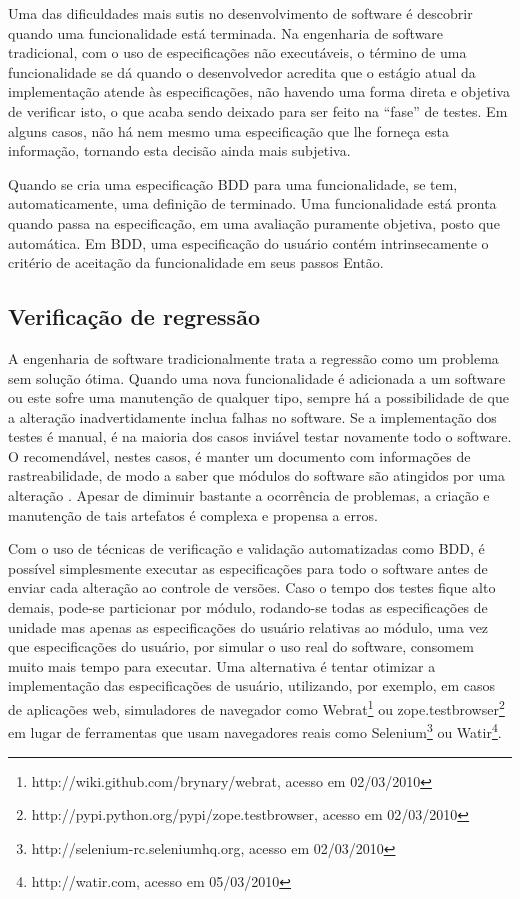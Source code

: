 \documentclass[a4paper,abntfigtabnum,noindentfirst]{abnt}
\begin{document}
Uma das dificuldades mais sutis no desenvolvimento de software é descobrir quando uma funcionalidade está terminada. Na engenharia de software tradicional, com o uso de especificações não executáveis, o término de uma funcionalidade se dá quando o desenvolvedor acredita que o estágio atual da implementação atende às especificações, não havendo uma forma direta e objetiva de verificar isto, o que acaba sendo deixado para ser feito na ``fase'' de testes. Em alguns casos, não há nem mesmo uma especificação que lhe forneça esta informação, tornando esta decisão ainda mais subjetiva.

Quando se cria uma especificação BDD para uma funcionalidade, se tem, automaticamente, uma definição de terminado. Uma funcionalidade está pronta quando passa na especificação, em uma avaliação puramente objetiva, posto que automática. Em BDD, uma especificação do usuário contém intrinsecamente o critério de aceitação da funcionalidade em seus passos Então.


\subsection*{Verificação de regressão}
A engenharia de software tradicionalmente trata a regressão como um problema sem solução ótima. Quando uma nova funcionalidade é adicionada a um software ou este sofre uma manutenção de qualquer tipo, sempre há a possibilidade de que a alteração inadvertidamente inclua falhas no software. Se a implementação dos testes é manual, é na maioria dos casos inviável testar novamente todo o software. O recomendável, nestes casos, é manter um documento com informações de rastreabilidade, de modo a saber que módulos do software são atingidos por uma alteração \cite{EngSoftPressman} \cite{EngSoftSommerville}. Apesar de diminuir bastante a ocorrência de problemas, a criação e manutenção de tais artefatos é complexa e propensa a erros.

Com o uso de técnicas de verificação e validação automatizadas como BDD, é possível simplesmente executar as especificações para todo o software antes de enviar cada alteração ao controle de versões. Caso o tempo dos testes fique alto demais, pode-se particionar por módulo, rodando-se todas as especificações de unidade mas apenas as especificações do usuário relativas ao módulo, uma vez que especificações do usuário, por simular o uso real do software, consomem muito mais tempo para executar. Uma alternativa é tentar otimizar a implementação das especificações de usuário, utilizando, por exemplo, em casos de aplicações web, simuladores de navegador como Webrat\footnote{http://wiki.github.com/brynary/webrat, acesso em 02/03/2010} ou zope.testbrowser\footnote{http://pypi.python.org/pypi/zope.testbrowser, acesso em 02/03/2010} em lugar de ferramentas que usam navegadores reais como Selenium\footnote{http://selenium-rc.seleniumhq.org, acesso em 02/03/2010} ou Watir\footnote{http://watir.com, acesso em 05/03/2010}.



\end{document}
